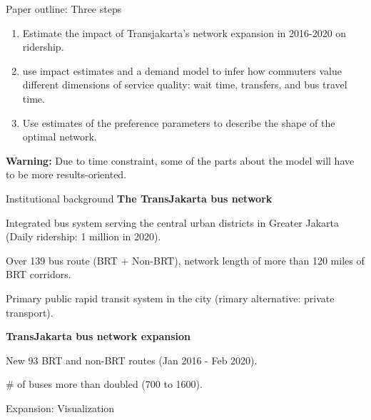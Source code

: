 \documentclass[notes,11pt, aspectratio=169]{beamer}
\newenvironment{wideitemize}{\itemize\addtolength{\itemsep}{0.4em}}{\enditemize}
\begin{document}
\begin{frame}{Paper outline: Three steps}
	\begin{enumerate}
		\item Estimate the impact of Transjakarta's network expansion in 2016-2020 on ridership.
		\item use impact estimates and a demand model to infer how commuters value different dimensions of service quality: wait time, transfers, and bus travel time.
		\item Use estimates of the preference parameters to describe the shape of the optimal network.
	\end{enumerate}	\vspace{2em}

	\textbf{Warning:} Due to time constraint, some of the parts about the model will have to be more results-oriented.
\end{frame}

\begin{frame}{Institutional background}
	\textbf{The TransJakarta bus network}	
	\begin{wideitemize}
		\item Integrated bus system serving the central urban districts in Greater Jakarta (Daily ridership: 1 million in 2020).
		\item Over 139 bus route (BRT + Non-BRT), network length of more than 120 miles of BRT corridors.
		\item Primary public rapid transit system in the city (rimary alternative: private transport).
		\end{wideitemize}\vspace{1em}

	\textbf{TransJakarta bus network expansion}
	\begin{wideitemize}
	\item New 93 BRT and non-BRT routes (Jan 2016 - Feb 2020).
	\item \# of buses more than doubled (700 to 1600).
	\end{wideitemize}
\end{frame}

\begin{frame}{Expansion: Visualization}
	\begin{figure}
	\end{figure}
\end{frame}
\end{document}
